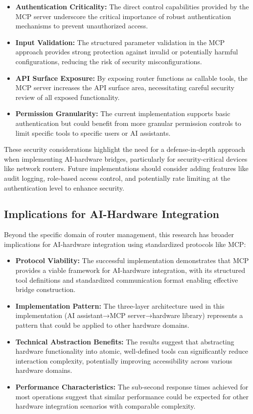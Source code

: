 \begin{itemize}
\item \textbf{Authentication Criticality:} The direct control capabilities provided by the MCP server underscore the critical importance of robust authentication mechanisms to prevent unauthorized access.
\item \textbf{Input Validation:} The structured parameter validation in the MCP approach provides strong protection against invalid or potentially harmful configurations, reducing the risk of security misconfigurations.
\item \textbf{API Surface Exposure:} By exposing router functions as callable tools, the MCP server increases the API surface area, necessitating careful security review of all exposed functionality.
\item \textbf{Permission Granularity:} The current implementation supports basic authentication but could benefit from more granular permission controls to limit specific tools to specific users or AI assistants.
\end{itemize}

These security considerations highlight the need for a defense-in-depth approach when implementing AI-hardware bridges, particularly for security-critical devices like network routers. Future implementations should consider adding features like audit logging, role-based access control, and potentially rate limiting at the authentication level to enhance security.

\subsection{Implications for AI-Hardware Integration}
Beyond the specific domain of router management, this research has broader implications for AI-hardware integration using standardized protocols like MCP:

\begin{itemize}
\item \textbf{Protocol Viability:} The successful implementation demonstrates that MCP provides a viable framework for AI-hardware integration, with its structured tool definitions and standardized communication format enabling effective bridge construction.
\item \textbf{Implementation Pattern:} The three-layer architecture used in this implementation (AI assistant→MCP server→hardware library) represents a pattern that could be applied to other hardware domains.
\item \textbf{Technical Abstraction Benefits:} The results suggest that abstracting hardware functionality into atomic, well-defined tools can significantly reduce interaction complexity, potentially improving accessibility across various hardware domains.
\item \textbf{Performance Characteristics:} The sub-second response times achieved for most operations suggest that similar performance could be expected for other hardware integration scenarios with comparable complexity.
\end{itemize}

